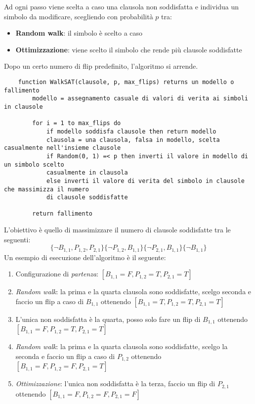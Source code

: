Ad ogni passo viene scelta a caso una clausola non soddisfatta e individua un simbolo da modificare, scegliendo con probabilità $p$ tra:
\begin{itemize}
	\item \textbf{Random walk}: il simbolo è scelto a caso
	\item \textbf{Ottimizzazione}: viene scelto il simbolo che rende più clausole soddisfatte
\end{itemize}
Dopo un certo numero di flip predefinito, l'algoritmo si arrende.
\begin{lstlisting}
	function WalkSAT(clausole, p, max_flips) returns un modello o fallimento
		modello = assegnamento casuale di valori di verita ai simboli in clausole
		
		for i = 1 to max_flips do
			if modello soddisfa clausole then return modello
			clausola = una clausola, falsa in modello, scelta casualmente nell'insieme clausole
			if Random(0, 1) =< p then inverti il valore in modello di un simbolo scelto
			casualmente in clausola
			else inverti il valore di verita del simbolo in clausole che massimizza il numero
			di clausole soddisfatte
			
		return fallimento
\end{lstlisting}

\begin{example}[WalkSAT]
	L'obiettivo è quello di massimizzare il numero di clausole soddisfatte tra le seguenti:
	\begin{equation*}
		\{\neg B_{1,1}, P_{1,2}, P_{2,1}\}\{\neg P_{1,2}, B_{1,1}\}\{\neg P_{2,1}, B_{1,1}\}\{\neg B_{1,1}\}
	\end{equation*}
	Un esempio di esecuzione dell'algoritmo è il seguente:
	\begin{enumerate}
		\item Configurazione di \textit{partenza}: $[B_{1,1}=F,P_{1,2}=T,P_{2,1}=T]$
		\item \textit{Random walk}: la prima e la quarta clausola sono soddisfatte, scelgo seconda e faccio un flip a caso di $B_{1,1}$ ottenendo $[B_{1,1}=T,P_{1,2}=T,P_{2,1}=T]$
		\item L'unica non soddisfatta è la quarta, posso solo fare un flip di $B_{1,1}$ ottenendo $[B_{1,1}=F,P_{1,2}=T,P_{2,1}=T]$
		\item \textit{Random walk}: la prima e la quarta clausola sono soddisfatte, scelgo la seconda e faccio un flip a caso di $P_{1,2}$ ottenendo $[B_{1,1}=F,P_{1,2}=F,P_{2,1}=T]$
		\item \textit{Ottimizzazione}: l'unica non soddisfatta è la terza, faccio un flip di $P_{2,1}$ ottenendo $[B_{1,1}=F,P_{1,2}=F,P_{2,1}=F]$
	\end{enumerate}
\end{example}

